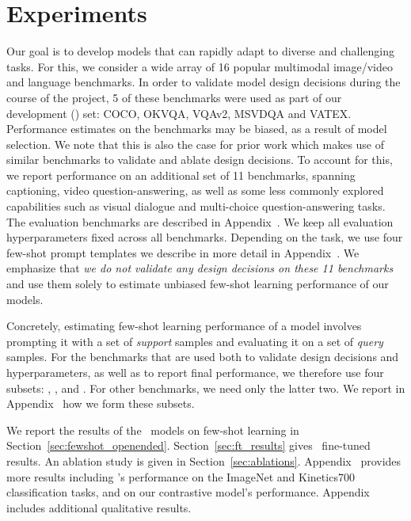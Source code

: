 \section{Experiments}
\label{sec:experiments}

Our goal is to develop models that can rapidly adapt to diverse and challenging tasks. 
For this, we consider a wide array of 16 popular multimodal image/video and language benchmarks.
In order to validate model design decisions during the course of the project, 5 of these benchmarks were used as part of our development (\dev{}) set: COCO, OKVQA, VQAv2, MSVDQA and VATEX.
Performance estimates on the \dev{} benchmarks may be biased, as a result of model selection.
We note that this is also the case for prior work which makes use of similar benchmarks to validate and ablate design decisions.
To account for this, we report performance on an additional set of 11 benchmarks,
spanning captioning, video question-answering, as well as some less commonly explored capabilities such as visual dialogue and multi-choice question-answering tasks.
The evaluation benchmarks are described in Appendix~.
We keep all evaluation hyperparameters fixed across all benchmarks.
Depending on the task, we use four few-shot prompt templates we describe in more detail in 
Appendix~.
We emphasize that \emph{we do not validate any design decisions on these 11 benchmarks} and use them solely to estimate unbiased few-shot learning performance of our models.

Concretely, estimating few-shot learning performance of
a model involves prompting it with a set of \emph{support} samples and evaluating it on a set of \emph{query} samples.
For the \dev{} benchmarks that are used both to validate design decisions and hyperparameters, as well as to report final performance, we therefore use four subsets:
\metadevsupportshort{}, \metadevqueryshort{}, \metatestsupportshort{} and \metatestqueryshort{}. 
For other benchmarks, we need only the latter two. 
We report in Appendix~ how we form these subsets.

We report the results of the~\method{} models on few-shot learning in Section~\ref{sec:fewshot_openended}.
Section~\ref{sec:ft_results} gives~\largem{} fine-tuned results.
An ablation study is given in Section~\ref{sec:ablations}.
Appendix~ provides more results including \method{}'s performance on the ImageNet and Kinetics700 classification tasks, and on our contrastive model's performance.
Appendix~ includes additional qualitative results.






